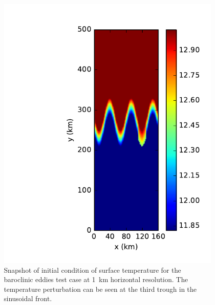\begin{figure}
  \includegraphics{../plots/eddies_snapshot_dx1_initial.pdf}
  \caption{\label{fig:eddies-snapshot_ic} Snapshot of initial condition of surface temperature for the baroclinic eddies test case at \SI{1}{\kilo\metre} horizontal resolution. The temperature perturbation can be seen at the third trough in the sinusoidal front.}
\end{figure}


